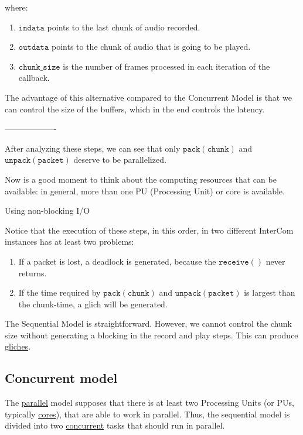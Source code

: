 where:
\begin{enumerate}
\item $\mathtt{indata}$ points to the last chunk of audio recorded.
\item $\mathtt{outdata}$ points to the chunk of audio that is going to be played.
\item $\mathtt{chunk\_size}$ is the number of frames processed in each iteration of the callback.
\end{enumerate}

The advantage of this alternative compared to the Concurrent Model is
that we can control the size of the buffers, which in the end controls the latency.


-------------------

After analyzing these steps, we can see that only $\mathtt{pack(chunk)}$ and $\mathtt{unpack(packet)}$ deserve to be parallelized.

Now is a good moment to think about the computing resources that can
be available: in general, more than one PU (Processing Unit) or core is available.

Using non-blocking I/O 
  
Notice that the execution of these steps, in this order, in two
different InterCom instances has at least two problems:
\begin{enumerate}
\item If a packet is lost, a deadlock is generated, because the
  $\mathtt{receive()}$ never returns.
\item If the time required by $\mathtt{pack(chunk)}$ and
  $\mathtt{unpack(packet)}$ is largest than the chunk-time, a glich
  will be generated.
\end{enumerate}

The Sequential Model is straightforward. However, we cannot control
the chunk size without generating a blocking in the record and play
steps. This can produce
\href{https://en.wikipedia.org/wiki/Glitch_(music)}{gliches}.

\subsection{Concurrent model}

The \href{https://en.wikipedia.org/wiki/Parallel_computing}{parallel}
model supposes that there is at least two Processing Units (or PUs,
typically
\href{https://en.wikipedia.org/wiki/Multi-core_processor}{cores}),
that are able to work in parallel. Thus, the sequential model is
divided into two
\href{https://en.wikipedia.org/wiki/Concurrency_(computer_science)}{concurrent}
tasks that should run in parallel.


